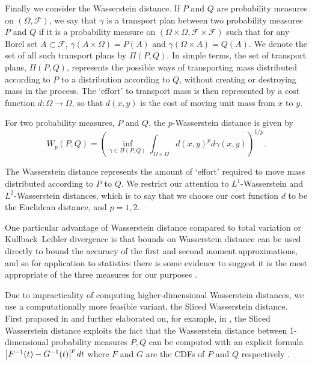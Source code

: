 Finally we consider the Wasserstein distance.  If $P$ and $Q$ are probability measures on $(\Omega, \mathcal{F})$, we say that $\gamma$ is a transport plan between two probability measures $P$ and $Q$ if it is a probability measure on $(\Omega \times \Omega, \mathcal{F} \times \mathcal{F})$ such that for any Borel set $A \subset \mathcal{F}$, $\gamma(A \times \Omega)=P(A)$ and $\gamma(\Omega \times A) = Q(A)$.  We denote the set of all such transport plans by $\Pi(P,Q)$.  In simple terms, the set of transport plans, $\Pi(P,Q)$, represents the possible ways of transporting mass distributed according to $P$ to a distribution according to $Q$, without creating or destroying mass in the process.  The `effort' to transport mass is then represented by a cost function $d:\Omega \to \Omega$, so that $d(x,y)$ is the cost of moving unit mass from $x$ to $y$.

\begin{defn}
For two probability measures, $P$ and $Q$, the $p$-Wasserstein distance is given by
$$
W_p(P,Q) = \left( \inf_{\gamma \in \Pi(P,Q)} \int_{\Omega \times \Omega} d(x,y)^p d \gamma(x,y) \right)^{1/p}.
$$
\end{defn}

The Wasserstein distance represents the amount of `effort' required to move mass distributed according to $P$ to $Q$.  We restrict our attention to $L^1$-Wasserstein and $L^2$-Wasserstein distances, which is to say that we choose our cost function $d$ to be the Euclidean distance, and $p=1,2$.

One particular advantage of Wasserstein distance compared to total variation or Kullback--Leibler divergence is that bounds on Wasserstein distance can be used directly to bound the accuracy of the first and second moment approximations, and so for application to statistics there is some evidence to suggest it is the most appropriate of the three measures for our purposes \cite{dalalyan2019user}.

Due to impracticality of computing higher-dimensional Wasserstein distances, we use a computationally more feasible variant, the Sliced Wasserstein distance. First proposed in \cite{rabin2011wasserstein} and further elaborated on, for example, in \cite{gswd}, the Sliced Wasserstein distance exploits the fact that the Wasserstein distance between 1-dimensional probability measures $P, Q$ can be computed with an explicit formula $\abs{F^{-1}(t)-G^{-1}(t)}^p dt$ where $F$ and $G$ are the CDFs of $P$ and $Q$ respectively \cite{ramdas2017wasserstein}.


